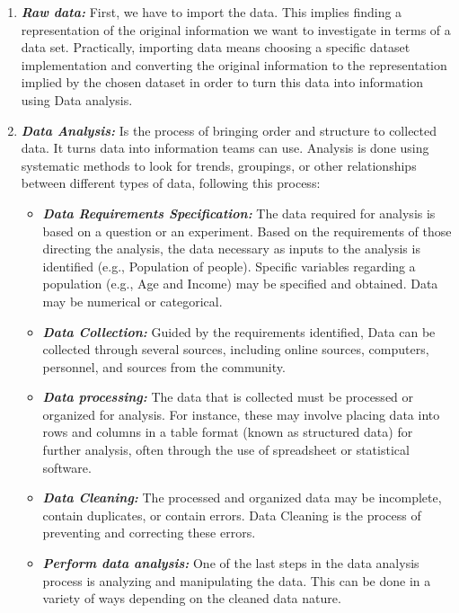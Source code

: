  
\begin{enumerate}
  \item \textbf{\textit{Raw data:}} First, we have to import the data. This implies finding a representation of the original information we want to investigate in terms of a data set. Practically, importing data means choosing a specific dataset implementation and converting the original information to the representation implied by the chosen dataset in order to turn this data into information using Data analysis.
  \item \textbf{\textit{Data Analysis:}} Is the process of bringing order and structure to collected data. It turns data into information teams can use. Analysis is done using systematic methods to look for trends, groupings, or other relationships between different types of data\cite{DataAnalysisVisualization}, following this process:
  \begin{itemize}
  \item \textbf{\textit{Data Requirements Specification:}} The data required for analysis is based on a question or an experiment. Based on the requirements of those directing the analysis, the data necessary as inputs to the analysis is identified (e.g., Population of people). Specific variables regarding a population (e.g., Age and Income) may be specified and obtained. Data may be numerical or categorical\cite{DataAnalysisProcess}.
  \item \textbf{\textit{Data Collection:}} Guided by the requirements identified, Data can be collected through several sources, including online sources, computers, personnel, and sources from the community.
  \item \textbf{\textit{Data processing:}} The data that is collected must be processed or organized for analysis. For instance, these may involve placing data into rows and columns in a table format (known as structured data) for further analysis, often through the use of spreadsheet or statistical software\cite{DataAnalysis2022}.
  \item \textbf{\textit{Data Cleaning:}} The processed and organized data may be incomplete, contain duplicates, or contain errors. Data Cleaning is the process of preventing and correcting these errors\cite{DataAnalysisProcess}. 
  \item \textbf{\textit{Perform data analysis:}}  One of the last steps in the data analysis process is analyzing and manipulating the data. This can be done in a variety of ways depending on the cleaned data nature\cite{WhatDataAnalysis}.

\end{itemize}
\end{enumerate}
